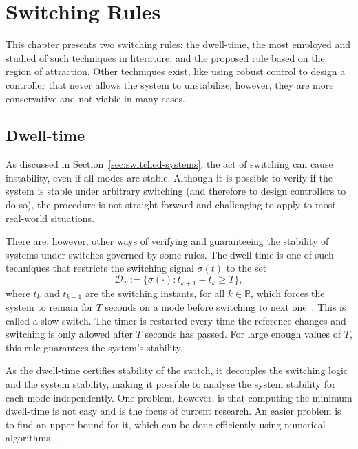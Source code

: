 
\chapter{Switching Rules}%
\label{chp:switching-rules}

This chapter presents two switching rules: the dwell-time, the most employed and
studied of such techniques in literature, and the proposed rule based on the
region of attraction. Other techniques exist, like using robust control to
design a controller that never allows the system to unstabilize; however, they
are more conservative and not viable in many cases.

\section{Dwell-time}%
\label{sec:dwell-time}

As discussed in Section~\ref{sec:switched-systems}, the act of switching can
cause instability, even if all modes are stable. Although it is possible to
verify if the system is stable under arbitrary switching (and therefore to
design controllers to do so), the procedure is not straight-forward and
challenging to apply to most real-world situations.

There are, however, other ways of verifying and guaranteeing the stability of
systems under switches governed by some rules. The dwell-time is one of such
techniques that restricts the switching signal \(\sigma{}(t)\) to the set
%
\begin{equation}
  \mathcal{D}_{T} := \{\sigma(\cdot):t_{k+1}-t_{k}\ge{}T\},
\end{equation}
%
where \(t_{k}\) and \(t_{k+1}\) are the switching instants, for all
\(k\in{}\mathbb{R}\), which forces the system to remain for \(T\) seconds on a
mode before switching to next one~\parencite{colaneri:dwell}. This is called a
slow switch. The timer is restarted every time the reference changes and
switching is only allowed after \(T\) seconds has passed. For large enough
values of \(T\), this rule guarantees the system's stability.

As the dwell-time certifies stability of the switch, it decouples the switching
logic and the system stability, making it possible to analyse the system
stability for each mode independently. One problem, however, is that computing
the minimum dwell-time is not easy and is the focus of current research. An
easier problem is to find an upper bound for it, which can be done efficiently
using numerical algorithms~\parencite{colaneri:dwell}.

